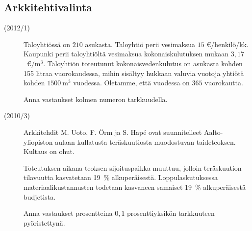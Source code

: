 \subsection*{Arkkitehtivalinta}

\begin{description}
    \item[(2012/1)] Taloyhtiössä on $210$ asukasta. Taloyhtiö perii vesimaksua
        $15$ \euro/henkilö/kk. Kaupunki perii taloyhtiöltä vesimaksua
        kokonaiskulutuksen mukaan $3,17$~\euro $/ \mathrm{m}^3$.
        Taloyhtiön toteutunut kokonaisvedenkulutus on asukasta kohden
        155 litraa vuorokaudessa, mihin sisältyy hukkaan valuvia
        vuotoja yhtiötä kohden $1500~\mathrm{m}^3$ vuodessa. Oletamme,
        että vuodessa on $365$ vuorokautta.
                    
    \begin{alakohdat}
    \end{alakohdat}
    
    Anna vastaukset kolmen numeron tarkkuudella.
\end{description}


\begin{description}
    \item[(2010/3)] Arkkitehdit M. Uoto, F. Örm ja S. Hapé ovat suunnitelleet Aalto-yliopiston aulaan kullatusta teräskuutiosta muodostuvan taideteoksen. Kultaus on ohut.
    
    Toteutuksen aikana teoksen sijoituspaikka muuttuu, jolloin teräskuution tilavuutta kasvatetaan 19~\% alkuperäisestä. Loppulaskutuksessa materiaalikustannusten todetaan kasvaneen samaiset 19~\% alkuperäisestä budjetista.                   
    \begin{alakohdat}
    \end{alakohdat}
    
    Anna vastaukset prosentteina $0,1$ prosenttiyksikön tarkkuuteen pyöristettynä.
\end{description}


